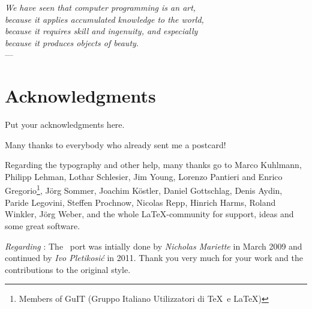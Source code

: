 
\begin{flushright}{\slshape    
    We have seen that computer programming is an art, \\ 
    because it applies accumulated knowledge to the world, \\ 
    because it requires skill and ingenuity, and especially \\
    because it produces objects of beauty.} \\ \medskip
    ---  \citep{knuth:1974}
\end{flushright}



\bigskip

\begingroup
\let\clearpage\relax
\let\cleardoublepage\relax
\let\cleardoublepage\relax
\chapter*{Acknowledgments}
Put your acknowledgments here.

Many thanks to everybody who already sent me a postcard!

Regarding the typography and other help, many thanks go to Marco 
Kuhlmann, Philipp Lehman, Lothar Schlesier, Jim Young, Lorenzo 
Pantieri and Enrico Gregorio\footnote{Members of GuIT (Gruppo 
Italiano Utilizzatori di \TeX\ e \LaTeX )}, J\"org Sommer, 
Joachim K\"ostler, Daniel Gottschlag, Denis Aydin, Paride 
Legovini, Steffen Prochnow, Nicolas Repp, Hinrich Harms, 
 Roland Winkler, J\"org Weber, 
 and the whole \LaTeX-community for support, ideas and 
 some great software.

\bigskip

\noindent\emph{Regarding \mLyX}: The \mLyX\ port was intially done by 
\emph{Nicholas Mariette} in March 2009 and continued by 
\emph{Ivo Pletikosi\'c} in 2011. Thank you very much for your 
work and the contributions to the original style.


\endgroup




